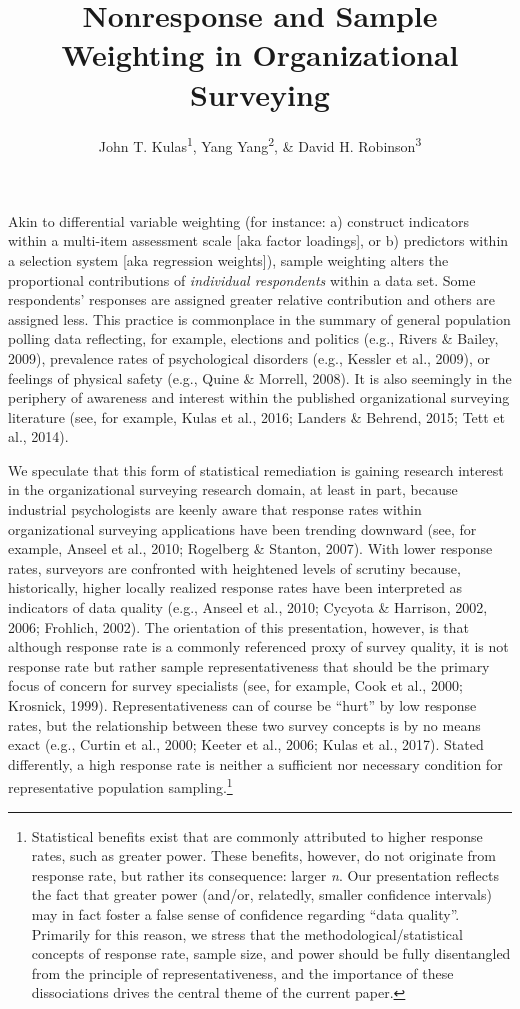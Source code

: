 \documentclass[
  man,mask]{apa7}
\title{Nonresponse and Sample Weighting in Organizational Surveying}
\author{John T. Kulas\textsuperscript{1}, Yang Yang\textsuperscript{2}, \& David H. Robinson\textsuperscript{3}}
\date{}
\affiliation{\vspace{0.5cm}\textsuperscript{1} Montclair State University\\\textsuperscript{2} Roche Group\\\textsuperscript{3} St.~Cloud State University}
\begin{document}
\maketitle

Akin to differential variable weighting (for instance: a) construct indicators within a multi-item assessment scale {[}aka factor loadings{]}, or b) predictors within a selection system {[}aka regression weights{]}), sample weighting alters the proportional contributions of \emph{individual respondents} within a data set. Some respondents' responses are assigned greater relative contribution and others are assigned less. This practice is commonplace in the summary of general population polling data reflecting, for example, elections and politics (e.g., Rivers \& Bailey, 2009), prevalence rates of psychological disorders (e.g., Kessler et al., 2009), or feelings of physical safety (e.g., Quine \& Morrell, 2008). It is also seemingly in the periphery of awareness and interest within the published organizational surveying literature (see, for example, Kulas et al., 2016; Landers \& Behrend, 2015; Tett et al., 2014).

We speculate that this form of statistical remediation is gaining research interest in the organizational surveying research domain, at least in part, because industrial psychologists are keenly aware that response rates within organizational surveying applications have been trending downward (see, for example, Anseel et al., 2010; Rogelberg \& Stanton, 2007). With lower response rates, surveyors are confronted with heightened levels of scrutiny because, historically, higher locally realized response rates have been interpreted as indicators of data quality (e.g., Anseel et al., 2010; Cycyota \& Harrison, 2002, 2006; Frohlich, 2002). The orientation of this presentation, however, is that although response rate is a commonly referenced proxy of survey quality, it is not response rate but rather sample representativeness that should be the primary focus of concern for survey specialists (see, for example, Cook et al., 2000; Krosnick, 1999). Representativeness can of course be ``hurt'' by low response rates, but the relationship between these two survey concepts is by no means exact (e.g., Curtin et al., 2000; Keeter et al., 2006; Kulas et al., 2017). Stated differently, a high response rate is neither a sufficient nor necessary condition for representative population sampling.\footnote{Statistical benefits exist that are commonly attributed to higher response rates, such as greater power. These benefits, however, do not originate from response rate, but rather its consequence: larger \emph{n}. Our presentation reflects the fact that greater power (and/or, relatedly, smaller confidence intervals) may in fact foster a false sense of confidence regarding ``data quality''. Primarily for this reason, we stress that the methodological/statistical concepts of response rate, sample size, and power should be fully disentangled from the principle of representativeness, and the importance of these dissociations drives the central theme of the current paper.}
\end{document}
